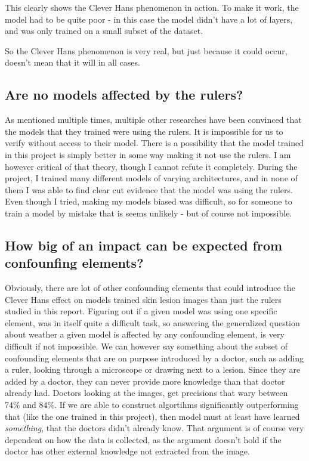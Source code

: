 This clearly shows the Clever Hans phenomenon in action.
To make it work, the model had to be quite poor - in this case the model didn't have a lot of layers,
and was only trained on a small subset of the dataset.

So the Clever Hans phenomenon is very real, but just because it could occur, doesn't mean that it will in all cases.

\subsection{Are no models affected by the rulers?}
As mentioned multiple times, multiple other researches have been convinced that the models that 
they trained were using the rulers.
It is impossible for us to verify without access to their model.
There is a possibility that the model trained in this project is simply better in some way making it not use the rulers.
I am however critical of that theory, though I cannot refute it completely.
During the project, I trained many different models of varying architectures,
and in none of them I was able to find clear cut evidence that the model was using the rulers.
Even though I tried, making my models biased was difficult, 
so for someone to train a model by mistake that is seems unlikely - but of course not impossible.

\subsection{How big of an impact can be expected from confounfing elements?}
Obviously, there are lot of other confounding elements that could introduce the Clever Hans effect on models trained 
skin lesion images than just the rulers studied in this report.
Figuring out if a given model was using one specific element, 
was in itself quite a difficult task, 
so answering the generalized question about weather a given model is affected by any confounding element,
is very difficult if not impossible.
We can however say something about the subset of confounding elements that are on purpose introduced by a doctor, 
such as adding a ruler, looking through a microscope or drawing next to a lesion.
Since they are added by a doctor, they can never provide more knowledge than that doctor already had.
Doctors looking at the images, get precisions that wary between $74\%$ and $84\%$\cite{multi-class-skin-lesion-hybrid}.
If we are able to construct algortihms significantly outperforming that (like the one trained in this project),
then model must at least have learned \textit{something}, that the doctors didn't already know.
That argument is of course very dependent on how the data is collected,
as the argument doesn't hold if the doctor has other external knowledge not extracted from the image.

